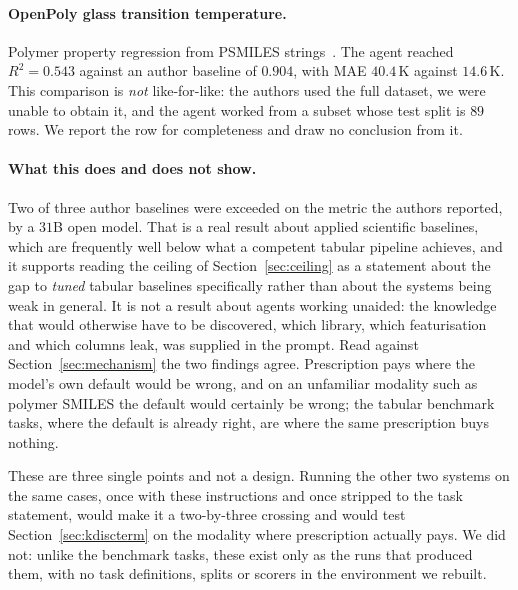 \paragraph{OpenPoly glass transition temperature.} Polymer property regression
from PSMILES strings~\citep{wang2025openpoly}. The agent reached $R^2 = 0.543$ against an author baseline
of $0.904$, with MAE $40.4$\,K against $14.6$\,K. This comparison is \emph{not}
like-for-like: the authors used the full dataset, we were unable to obtain it,
and the agent worked from a subset whose test split is $89$ rows. We report the
row for completeness and draw no conclusion from it.

\paragraph{What this does and does not show.} Two of three author baselines were
exceeded on the metric the authors reported, by a $31$B open model. That is a
real result about applied scientific baselines, which are frequently well below
what a competent tabular pipeline achieves, and it supports reading the ceiling
of Section~\ref{sec:ceiling} as a statement about the gap to \emph{tuned}
tabular baselines specifically rather than about the systems being weak in
general. It is not a result about agents working unaided: the knowledge that
would otherwise have to be discovered, which library, which featurisation and
which columns leak, was supplied in the prompt. Read against
Section~\ref{sec:mechanism} the two findings agree. Prescription pays where the
model's own default would be wrong, and on an unfamiliar modality such as
polymer SMILES the default would certainly be wrong; the tabular benchmark
tasks, where the default is already right, are where the same prescription buys
nothing.

These are three single points and not a design. Running the other two systems on
the same cases, once with these instructions and once stripped to the task
statement, would make it a two-by-three crossing and would test
Section~\ref{sec:kdiscterm} on the modality where prescription actually pays. We
did not: unlike the benchmark tasks, these exist only as the runs that produced
them, with no task definitions, splits or scorers in the environment we rebuilt.
